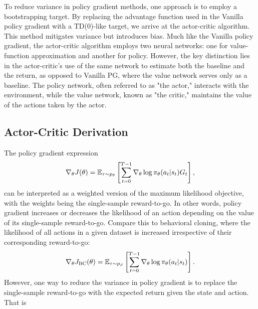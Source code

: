 \documentclass{article}
\begin{document}
To reduce variance in policy gradient methods, one approach is to employ a bootstrapping target. By replacing the advantage function used in the Vanilla policy gradient with a TD(0)-like target, we arrive at the actor-critic algorithm. This method mitigates variance but introduces bias. Much like the Vanilla policy gradient, the actor-critic algorithm employs two neural networks: one for value-function approximation and another for policy. However, the key distinction lies in the actor-critic's use of the same network to estimate both the baseline and the return, as opposed to Vanilla PG, where the value network serves only as a baseline. The policy network, often referred to as "the actor," interacts with the environment, while the value network, known as "the critic," maintains the value of the actions taken by the actor.

\subsection{Actor-Critic Derivation}

The policy gradient expression
\begin{align*}
    \nabla_\theta J(\theta) = {\mathbb E}_{\tau \sim p_\theta} \left[\sum_{t=0}^{T-1} \nabla_\theta \log \pi_\theta(a_t \vert s_t) G_t\right],
\end{align*}
can be interpreted as a weighted version of the maximum likelihood objective, with the weights being the single-sample reward-to-go. In other words, policy gradient increases or decreases the likelihood of an action depending on the value of its single-sample reward-to-go. Compare this to behavioral cloning, where the likelihood of all actions in a given dataset is increased irrespective of their corresponding reward-to-go:
\begin{align*}
    \nabla_\theta J_{\rm {BC}}(\theta) = {\mathbb E}_{\tau \sim p_\beta} \left[\sum_{t=0}^{T-1} \nabla_\theta \log \pi_\theta(a_t \vert s_t)\right].
\end{align*}
However, one way to reduce the variance in policy gradient is to replace the single-sample reward-to-go with the expected return given the state and action. That is
\end{document}
